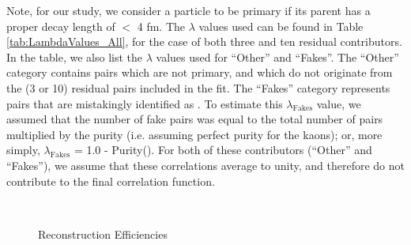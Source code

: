 \documentclass[/home/jesse/Analysis/FemtoAnalysis/AnalysisNotes/AnalysisNoteJBuxton.tex]{subfiles}
\begin{document}
Note, for our study, we consider a particle to be primary if its parent has a proper decay length of $<$ 4 fm.
The $\lambda$ values used can be found in Table \ref{tab:LambdaValues_All}, for the case of both three and ten residual contributors.  In the table, we also list the $\lambda$ values used for ``Other'' and ``Fakes''.  The ``Other'' category contains pairs which are not primary, and which do not originate from the (3 or 10) residual pairs included in the fit.  The ``Fakes'' category represents pairs that are mistakingly identified as \LamK.  To estimate this $\lambda_{\mathrm{Fakes}}$ value, we assumed that the number of fake pairs was equal to the total number of pairs multiplied by the \Lam purity (i.e. assuming perfect purity for the kaons); or, more simply, $\lambda_{\mathrm{Fakes}}$ = 1.0 - Purity(\Lam).  For both of these contributors (``Other'' and ``Fakes''), we assume that these correlations average to unity, and therefore do not contribute to the final correlation function.


\begin{figure}[h!]
  \centering
   \\
  \caption[Reconstruction Efficiencies]{Reconstruction Efficiencies}
  \label{fig:RecoEffs}
\end{figure}
\end{document}
